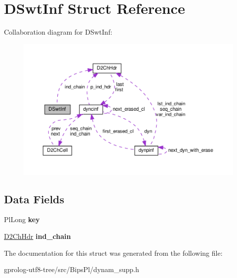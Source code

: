 \hypertarget{structDSwtInf}{}\section{D\+Swt\+Inf Struct Reference}
\label{structDSwtInf}


Collaboration diagram for D\+Swt\+Inf\+:\nopagebreak
\begin{figure}[H]
\begin{center}
\leavevmode
\includegraphics[width=350pt]{structDSwtInf__coll__graph}
\end{center}
\end{figure}
\subsection*{Data Fields}
\begin{DoxyCompactItemize}
\item 
Pl\+Long {\bfseries key}\hypertarget{structDSwtInf_a9661c05b42d3c1c0deb724486fc685b9}{}\label{structDSwtInf_a9661c05b42d3c1c0deb724486fc685b9}

\item 
\hyperlink{structD2ChHdr}{D2\+Ch\+Hdr} {\bfseries ind\+\_\+chain}\hypertarget{structDSwtInf_aa4386ca4933b9847a0622d980023e4c8}{}\label{structDSwtInf_aa4386ca4933b9847a0622d980023e4c8}

\end{DoxyCompactItemize}


The documentation for this struct was generated from the following file\+:\begin{DoxyCompactItemize}
\item 
gprolog-\/utf8-\/tree/src/\+Bips\+Pl/dynam\+\_\+supp.\+h\end{DoxyCompactItemize}
